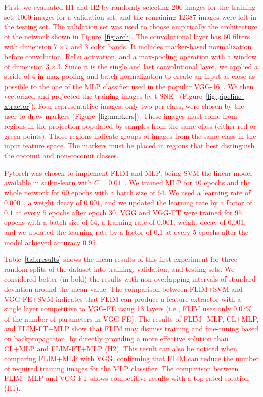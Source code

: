 \documentclass[journal, twoside]{IEEEtran}
\begin{document}
\textcolor{red}{First, we evaluated H1 and H2 by randomly selecting 200 images for the training set, 1000 images for a validation set, and the remaining 12387 images were left in the testing set. The validation set was used to choose empirically the architecture of the network shown in Figure~\ref{fig:arch}. The convolutional layer has $60$ filters with dimension $7 \times 7$ and 3 color \textcolor{red}{bands}. It includes marker-based normalization before convolution, ReLu activation, and a max-pooling operation with a window of dimension $3 \times 3$. Since it is the single and last convolutional layer, we applied a stride of $4$ in max-pooling and batch normalization to create an input as close as possible to the one of the \textcolor{red}{MLP} classifier used in the popular VGG-16~\cite{simonyan2014very}. We then vectorized and projected the training images by t-SNE~\cite{maaten2008visualizing} (Figure~\ref{fig:pipeline-xtractor}). Four representative images, only two per class, were chosen by the user to draw markers (Figure~\ref{fig:markers}). These images must come from regions in the projection populated by samples from the same class (either red or green points). Those regions indicate groups of images from the same class in the input feature space. The markers must be placed in regions that best distinguish the coconut and non-coconut classes.}

\textcolor{red}{Pytorch was chosen to implement FLIM and MLP, being SVM the linear model available in scikit-learn with $C=0.01$~\cite{fan2008liblinear, scikit-learn}. We trained MLP for $40$ epochs and the whole network for $60$ epochs with a batch size of $64$. We used a learning rate of $0.0001$, a weight decay of $0.001$, and we updated the learning rate by a factor of $0.1$ at every $5$ epochs after epoch 30. VGG and VGG-FT were trained for $95$ epochs with a batch size of $64$, a learning rate of $0.001$, weight decay of $0.001$, and we updated the learning rate by a factor of $0.1$ at every $5$ epochs after the model achieved accuracy $0.95$.}

\textcolor{red}{
Table~\ref{tab:results} shows the mean results of this first experiment for three random splits of the dataset into training, validation, and testing sets. We considered better (in bold) the results with non-overlapping intervals of standard deviation around the mean value. The comparison between FLIM+SVM and VGG-FE+SVM indicates that FLIM can produce a feature extractor with a single layer competitive to VGG-FE using 13 layers (i.e., FLIM uses only $0.07\%$ of the number of parameters in VGG-FE). The results of FLIM+MLP, CL+MLP, and FLIM-FT+MLP show that FLIM may dismiss training and fine-tuning based on backpropagation, by directly providing a more effective solution than CL+MLP and FLIM-FT+MLP (H2). This result can also be noticed when comparing  FLIM+MLP with VGG, confirming that FLIM can reduce the number of required training images for the MLP classifier. The comparison between FLIM+MLP and VGG-FT shows competitive results with a top-rated solution (H1).}
\end{document}
